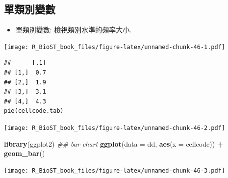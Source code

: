 \documentclass[
]{book}
\newenvironment{Shaded}{\begin{snugshade}}{\end{snugshade}}
\newcommand{\CommentTok}[1]{\textcolor[rgb]{0.56,0.35,0.01}{\textit{#1}}}
\newcommand{\DataTypeTok}[1]{\textcolor[rgb]{0.13,0.29,0.53}{#1}}
\newcommand{\DecValTok}[1]{\textcolor[rgb]{0.00,0.00,0.81}{#1}}
\newcommand{\KeywordTok}[1]{\textcolor[rgb]{0.13,0.29,0.53}{\textbf{#1}}}
\newcommand{\NormalTok}[1]{#1}
\newcommand{\OperatorTok}[1]{\textcolor[rgb]{0.81,0.36,0.00}{\textbf{#1}}}
\newcommand{\StringTok}[1]{\textcolor[rgb]{0.31,0.60,0.02}{#1}}
\providecommand{\tightlist}{%
  \setlength{\itemsep}{0pt}\setlength{\parskip}{0pt}}
\begin{document}
\hypertarget{ux55aeux985eux5225ux8b8aux6578}{%
\subsection{單類別變數}\label{ux55aeux985eux5225ux8b8aux6578}}

\begin{itemize}
\tightlist
\item
  單類別變數: 檢視類別水準的頻率大小.
\end{itemize}

\begin{Shaded}
\end{Shaded}

\texttt{[image: R\_BioST\_book\_files/figure-latex/unnamed-chunk-46-1.pdf]}

\begin{verbatim}
##      [,1]
## [1,]  0.7
## [2,]  1.9
## [3,]  3.1
## [4,]  4.3
pie(cellcode.tab)
\end{verbatim}

\texttt{[image: R\_BioST\_book\_files/figure-latex/unnamed-chunk-46-2.pdf]}

\begin{Shaded}
\begin{Highlighting}[]
\KeywordTok{library}\NormalTok{(ggplot2)}
\CommentTok{\#\# bar chart}
\KeywordTok{ggplot}\NormalTok{(}\DataTypeTok{data =}\NormalTok{ dd, }\KeywordTok{aes}\NormalTok{(}\DataTypeTok{x =}\NormalTok{ cellcode)) }\OperatorTok{+}
\StringTok{  }\KeywordTok{geom\_bar}\NormalTok{()}
\end{Highlighting}
\end{Shaded}

\texttt{[image: R\_BioST\_book\_files/figure-latex/unnamed-chunk-46-3.pdf]}
\end{document}
